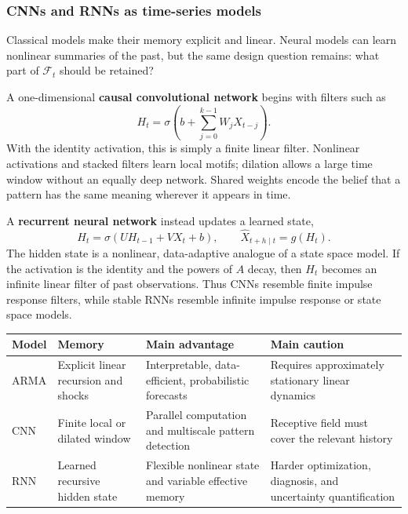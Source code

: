 \subsubsection{CNNs and RNNs as time-series models}
Classical models make their memory explicit and linear. Neural models can learn
nonlinear summaries of the past, but the same design question remains: what part
of $\mathcal{F}_t$ should be retained?

A one-dimensional \textbf{causal convolutional network} begins with filters such as
\[
    H_t=\sigma\!\left(b+\sum_{j=0}^{k-1}W_jX_{t-j}\right).
\]
With the identity activation, this is simply a finite linear filter. Nonlinear
activations and stacked filters learn local motifs; dilation allows a large time
window without an equally deep network. Shared weights encode the belief that a
pattern has the same meaning wherever it appears in time.

A \textbf{recurrent neural network} instead updates a learned state,
\[
    H_t=\sigma(UH_{t-1}+VX_t+b),
    \qquad
    \widehat{X}_{t+h\mid t}=g(H_t).
\]
The hidden state is a nonlinear, data-adaptive analogue of a state space model.
If the activation is the identity and the powers of $A$ decay, then
$H_t$ becomes an infinite linear filter of past observations. Thus CNNs resemble
finite impulse response filters, while stable RNNs resemble infinite impulse
response or state space models.

\begin{center}
\begin{tabular}{>{\raggedright\arraybackslash}p{}
                >{\raggedright\arraybackslash}p{}
                >{\raggedright\arraybackslash}p{}
                >{\raggedright\arraybackslash}p{}}
\toprule
Model & Memory & Main advantage & Main caution\\
\midrule
ARMA & Explicit linear recursion and shocks & Interpretable, data-efficient, probabilistic forecasts & Requires approximately stationary linear dynamics\\
CNN & Finite local or dilated window & Parallel computation and multiscale pattern detection & Receptive field must cover the relevant history\\
RNN & Learned recursive hidden state & Flexible nonlinear state and variable effective memory & Harder optimization, diagnosis, and uncertainty quantification\\
\bottomrule
\end{tabular}
\end{center}

